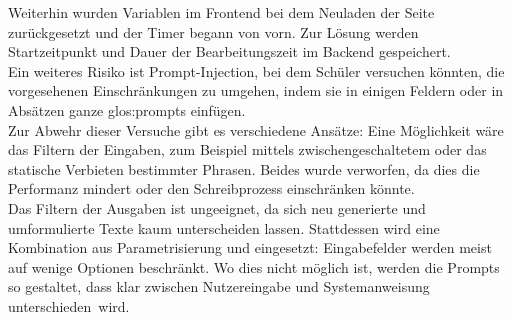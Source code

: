 \documentclass[../main.tex]{subfiles}
\begin{document}
Weiterhin wurden Variablen im Frontend bei dem Neuladen der Seite zurückgesetzt und der Timer begann von vorn. Zur Lösung werden Startzeitpunkt und Dauer der Bearbeitungszeit im Backend 
gespeichert.\\ 
Ein weiteres Risiko ist Prompt-Injection, bei dem Schüler versuchen könnten, die vorgesehenen Einschränkungen zu umgehen, indem sie in einigen Feldern oder in Absätzen ganze \gls{glos:prompt}s einfügen.\\ 
Zur Abwehr dieser Versuche gibt es verschiedene Ansätze: Eine Möglichkeit wäre das Filtern der Eingaben, zum Beispiel mittels zwischengeschaltetem  oder das statische Verbieten 
bestimmter Phrasen. Beides wurde verworfen, da dies die Performanz mindert oder den Schreibprozess einschränken könnte. \cite{promptinjection}\\
Das Filtern der Ausgaben ist ungeeignet, da sich neu generierte und umformulierte Texte kaum unterscheiden lassen. Stattdessen wird eine Kombination aus Parametrisierung und  
eingesetzt: Eingabefelder werden meist auf wenige Optionen beschränkt. Wo dies nicht möglich ist, werden die Prompts so gestaltet, dass klar zwischen Nutzereingabe und Systemanweisung \mbox{unterschieden wird.}
\end{document}

